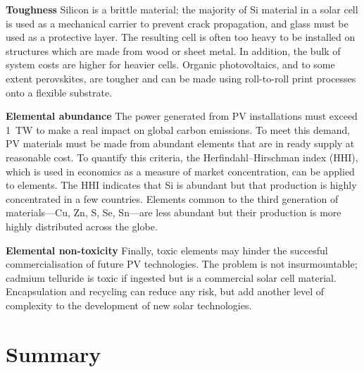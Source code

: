 \newline
\textbf{Toughness}\newline
Silicon is a brittle material; the majority of Si material in a solar cell is used as a mechanical carrier to prevent crack propagation, and glass must be used as a protective layer. The resulting cell is often too heavy to be installed on structures which are made from wood or sheet metal. In addition, the bulk of system costs are higher for heavier cells. Organic photovoltaics, and to some extent perovskites, are tougher and can be made using roll-to-roll print processes onto a flexible substrate.

\newline
\textbf{Elemental abundance}\newline
The power generated from PV installations must exceed \SI{1}{TW} to make a real impact on global carbon emissions.\autocite{Battersby2019} To meet this demand, PV materials must be made from abundant elements that are in ready supply at reasonable cost. To quantify this criteria, the Herfindahl–Hirschman index (HHI), which is used in economics as a measure of market concentration, can be applied to elements. The HHI indicates that Si is abundant but that production is highly concentrated in a few countries. Elements common to the third generation of materials---Cu, Zn, S, Se, Sn---are less abundant but their production is more highly distributed across the globe.\autocite{Gaultois2013}

\newline
\textbf{Elemental non-toxicity} \newline
Finally, toxic elements may hinder the succesful commercialisation of future PV technologies. The problem is not insurmountable; cadmium telluride is toxic if ingested but is a commercial solar cell material. Encapsulation and recycling can reduce any risk, but add another level of complexity to the development of new solar technologies.

\section{Summary}


